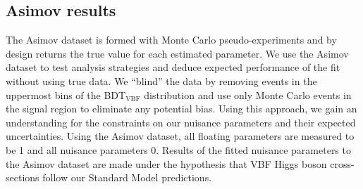 
\subsection{Asimov results}
The Asimov dataset is formed with Monte Carlo pseudo-experiments and by design returns the true value for each estimated parameter. We use the Asimov dataset to test analysis strategies and deduce expected performance of the fit without using true data. We ``blind'' the data by removing events in the uppermost bins of the BDT$_{\text{VBF}}$ distribution and use only Monte Carlo events in the signal region to eliminate any potential bias. Using this approach, we gain an understanding for the constraints on our nuisance parameters and their expected uncertainties. Using the Asimov dataset, all floating parameters are measured to be 1 and all nuisance parameters 0. Results of the fitted nuisance parameters to the Asimov dataset are made under the hypothesis that VBF Higgs boson cross-sections follow our Standard Model predictions. 

